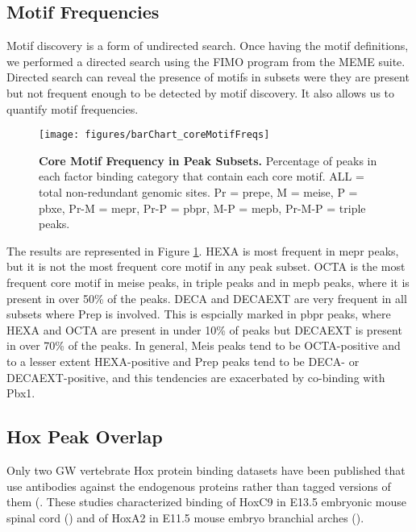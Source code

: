 \subsection{Motif Frequencies}

Motif discovery is a form of undirected search. Once having the motif definitions, we performed a directed search using the FIMO program from the MEME suite. Directed search can reveal the presence of motifs in subsets were they are present but not frequent enough to be detected by motif discovery. It also allows us to quantify motif frequencies.

\begin{figure}[]
  \centering
  \texttt{[image: figures/barChart\_coreMotifFreqs]}
  \caption[Core Motif Frequency in Peak Subsets]{\textbf{Core Motif Frequency in Peak Subsets.} Percentage of peaks in each factor binding category that contain each core motif. ALL = total non-redundant genomic sites. Pr = \ac{prepe}, M = \ac{meise}, P = \ac{pbxe}, Pr-M = \ac{mepr}, Pr-P = \ac{pbpr}, M-P = \ac{mepb}, Pr-M-P = triple peaks.}
  \label{fig:coreMotifFreqs}
\end{figure}

The results are represented in Figure \ref{fig:coreMotifFreqs}. \ac{HEXA} is most frequent in \ac{mepr} peaks, but it is not the most frequent core motif in any peak subset. \ac{OCTA} is the most frequent core motif in \ac{meise} peaks, in triple peaks and in \ac{mepb} peaks, where it is present in over 50\% of the peaks. \ac{DECA} and \ac{DECAEXT} are very frequent in all subsets where Prep is involved. This is espcially marked in \ac{pbpr} peaks, where \ac{HEXA} and \ac{OCTA} are present in under 10\% of peaks but  \ac{DECAEXT} is present in over 70\% of the peaks. In general, Meis peaks tend to be \ac{OCTA}-positive and to a lesser extent \ac{HEXA}-positive and Prep peaks tend to be \ac{DECA}- or \ac{DECAEXT}-positive, and this tendencies are exacerbated by co-binding with Pbx1. 

\subsection{Hox Peak Overlap}

Only two \ac{GW} vertebrate Hox protein binding datasets have been published that use antibodies against the endogenous proteins rather than tagged versions of them (\cite{Jung2010,Donaldson2012}. These studies characterized binding of HoxC9 in E13.5 embryonic mouse spinal cord (\cite{Jung2010}) and of HoxA2 in E11.5 mouse embryo branchial arches (\cite{Donaldson2012}).

